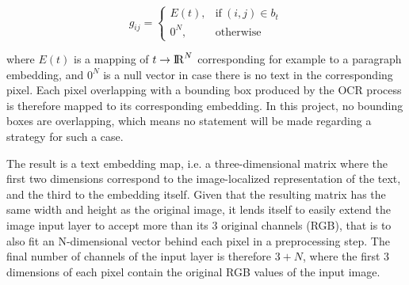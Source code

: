 \documentclass[oneside, english, bibtex]{kththesis}
\begin{document}
\begin{equation}
	g_{ij} =
	    \begin{cases}
	      E(t), & \text{if}\ (i,j) \in b_t \\
	      0^N, & \text{otherwise}
	    \end{cases}
  	\label{eqn:textembedding}
\end{equation}

where $E(t)$ is a mapping of $t \rightarrow {\rm I\!R}^N$ corresponding for example to a paragraph embedding, and $0^N$ is a null vector in case there is no text in the corresponding pixel. Each pixel overlapping with a bounding box produced by the OCR process is therefore mapped to its corresponding embedding. In this project, no bounding boxes are overlapping, which means no statement will be made regarding a strategy for such a case.

The result is a text embedding map, i.e. a three-dimensional matrix where the first two dimensions correspond to the image-localized representation of the text, and the third to the embedding itself. Given that the resulting matrix has the same width and height as the original image, it lends itself to easily extend the image input layer to accept more than its 3 original channels (RGB), that is to also fit an N-dimensional vector behind each pixel in a preprocessing step. The final number of channels of the input layer is therefore $3+N$, where the first 3 dimensions of each pixel contain the original RGB values of the input image.
\end{document}
